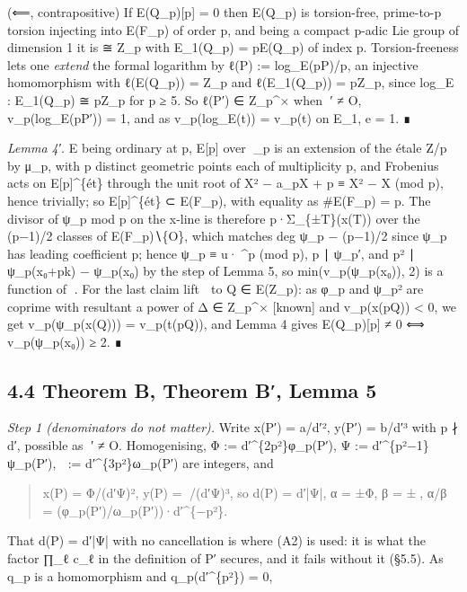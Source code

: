 \documentclass[11pt,a4paper]{article}
\theoremstyle{named}
\begin{document}
(⟸, contrapositive) If E(Q\_p)[p] = 0 then E(Q\_p) is torsion-free, prime-to-p torsion injecting into E(F\_p) of order p, and being a compact p-adic Lie group of dimension 1 it is ≅ Z\_p with E\_1(Q\_p) = pE(Q\_p) of index p. Torsion-freeness lets one \textit{extend} the formal logarithm by ℓ(P) := log\_E(pP)/p, an injective homomorphism with ℓ(E(Q\_p)) = Z\_p and ℓ(E\_1(Q\_p)) = pZ\_p, since log\_E : E\_1(Q\_p) ≅ pZ\_p for p ≥ 5. So ℓ(P′) ∈ Z\_p\textasciicircum{}× when ′ ≠ O, v\_p(log\_E(pP′)) = 1, and as v\_p(log\_E(t)) = v\_p(t) on E\_1, e = 1. ∎

\textit{Lemma 4′.} E being ordinary at p, E[p] over \_p is an extension of the étale Z/p by μ\_p, with p distinct geometric points each of multiplicity p, and Frobenius acts on E[p]\textasciicircum{}\{ét\} through the unit root of X² − a\_pX + p ≡ X² − X (mod p), hence trivially; so E[p]\textasciicircum{}\{ét\} ⊂ E(F\_p), with equality as \#E(F\_p) = p. The divisor of ψ\_p mod p on the x-line is therefore p·Σ\_\{±T\}(x(T)) over the (p−1)/2 classes of E(F\_p)∖\{O\}, which matches deg ψ\_p − (p−1)/2 since ψ\_p has leading coefficient p; hence ψ\_p ≡ u·\textasciicircum{}p (mod p), p ∣ ψ\_p′, and p² ∣ ψ\_p(x₀+pk) − ψ\_p(x₀) by the step of Lemma 5, so min(v\_p(ψ\_p(x₀)), 2) is a function of . For the last claim lift  to Q ∈ E(Z\_p): as φ\_p and ψ\_p² are coprime with resultant a power of Δ ∈ Z\_p\textasciicircum{}× [known] and v\_p(x(pQ)) \textless{} 0, we get v\_p(ψ\_p(x(Q))) = v\_p(t(pQ)), and Lemma 4 gives E(Q\_p)[p] ≠ 0 ⟺ v\_p(ψ\_p(x₀)) ≥ 2. ∎

\subsection*{4.4 Theorem B, Theorem B′, Lemma 5}

\textit{Step 1 (denominators do not matter).} Write x(P′) = a/d′², y(P′) = b/d′³ with p ∤ d′, possible as ′ ≠ O. Homogenising, Φ := d′\textasciicircum{}\{2p²\}φ\_p(P′), Ψ := d′\textasciicircum{}\{p²−1\}ψ\_p(P′),  := d′\textasciicircum{}\{3p²\}ω\_p(P′) are integers, and

\begin{quote}
x(P) = Φ/(d′Ψ)², y(P) = /(d′Ψ)³, so d(P) = d′|Ψ|, α = ±Φ, β = ±, α/β = (φ\_p(P′)/ω\_p(P′))·d′\textasciicircum{}\{−p²\}.
\end{quote}

That d(P) = d′|Ψ| with no cancellation is where (A2) is used: it is what the factor ∏\_ℓ c\_ℓ in the definition of P′ secures, and it fails without it (§5.5). As q\_p is a homomorphism and q\_p(d′\textasciicircum{}\{p²\}) = 0,
\end{document}
